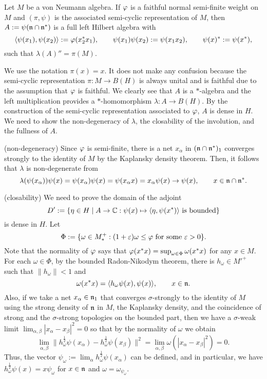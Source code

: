 \documentclass{../../small}
\begin{document}
\begin{thm}
Let $M$ be a von Neumann algebra.
If $\varphi$ is a faithful normal semi-finite weight on $M$ and $(\pi,\psi)$ is the associated semi-cyclic representation of $M$, then $A:=\psi(\mathfrak{n}\cap\mathfrak{n}^*)$ is a full left Hilbert algebra with
\[\langle\psi(x_1),\psi(x_2)\rangle:=\varphi(x_2^*x_1),\qquad \psi(x_1)\psi(x_2):=\psi(x_1x_2),\qquad\psi(x)^*:=\psi(x^*),\]
such that $\lambda(A)''=\pi(M)$.
\end{thm}
\begin{pf}
We use the notation $\pi(x)=x$.
It does not make any confusion because the semi-cyclic representation $\pi:M\to B(H)$ is always unital and is faithful due to the assumption that $\varphi$ is faithful.
We clearly see that $A$ is a $*$-algebra and the left multiplication provides a $*$-homomorphism $\lambda:A\to B(H)$.
By the construction of the semi-cyclic representation associated to $\varphi$, $A$ is dense in $H$.
We need to show the non-degeneracy of $\lambda$, the closability of the involution, and the fullness of $A$.

(non-degeneracy)
Since $\varphi$ is semi-finite, there is a net $x_\alpha$ in $(\mathfrak{n}\cap\mathfrak{n}^*)_1$ converges strongly to the identity of $M$ by the Kaplansky density theorem.
Then, it follows that $\lambda$ is non-degenerate from
\[\lambda(\psi(x_\alpha))\psi(x)=\psi(x_\alpha)\psi(x)=\psi(x_\alpha x)=x_\alpha\psi(x)\to\psi(x),\qquad x\in\mathfrak{n}\cap\mathfrak{n}^*.\]

(closability)
We need to prove the domain of the adjoint
\[D':=\{\eta\in H\mid A\to\mathbb{C}:\psi(x)\mapsto\langle\eta,\psi(x^*)\rangle\text{ is bounded}\}\]
is dense in $H$.
Let
\[\Phi:=\{\omega\in M_*^+:(1+\varepsilon)\omega\le\varphi\text{ for some }\varepsilon>0\}.\]
Note that the normality of $\varphi$ says that $\varphi(x^*x)=\sup_{\omega\in\Phi}\omega(x^*x)$ for any $x\in M$.
For each $\omega\in\Phi$, by the bounded Radon-Nikodym theorem, there is $h_\omega\in M'^+$ such that $\|h_\omega\|<1$ and
\[\omega(x^*x)=\langle h_\omega\psi(x),\psi(x)\rangle,\qquad x\in\mathfrak{n}.\]
Also, if we take a net $x_\alpha\in\mathfrak{n}_1$ that converges $\sigma$-strongly to the identity of $M$ using the strong density of $\mathfrak{n}$ in $M$, the Kaplansky density, and the coincidence of strong and the $\sigma$-strong topologies on the bounded part, then we have a $\sigma$-weak limit $\lim_{\alpha,\beta}|x_\alpha-x_\beta|^2=0$ so that by the normality of $\omega$ we obtain
\[\lim_{\alpha,\beta}\|h_\omega^{\frac12}\psi(x_\alpha)-h_\omega^{\frac12}\psi(x_\beta)\|^2=\lim_{\alpha,\beta}\omega(|x_\alpha-x_\beta|^2)=0.\]
Thus, the vector $\psi_\omega:=\lim_\alpha h_\omega^{\frac12}\psi(x_\alpha)$ can be defined, and in particular, we have $h_\omega^{\frac12}\psi(x)=x\psi_\omega$ for $x\in\mathfrak{n}$ and $\omega=\omega_{\psi_\omega}$.


\end{pf}
\end{document}
